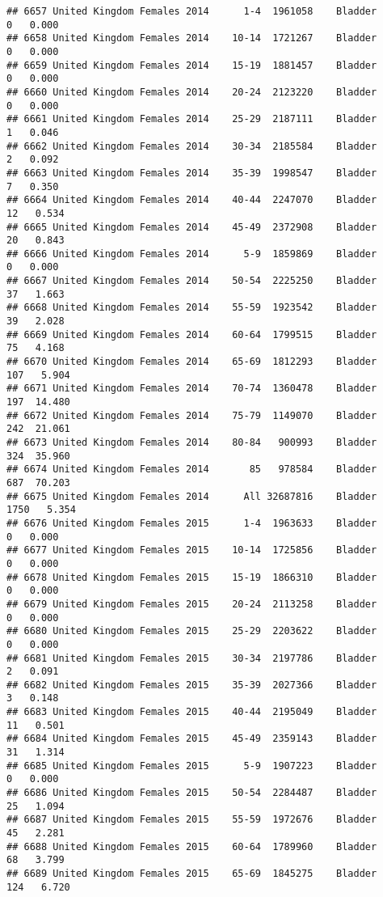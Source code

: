 \documentclass[
]{article}
\begin{document}
\begin{verbatim}
## 6657 United Kingdom Females 2014      1-4  1961058    Bladder      0   0.000
## 6658 United Kingdom Females 2014    10-14  1721267    Bladder      0   0.000
## 6659 United Kingdom Females 2014    15-19  1881457    Bladder      0   0.000
## 6660 United Kingdom Females 2014    20-24  2123220    Bladder      0   0.000
## 6661 United Kingdom Females 2014    25-29  2187111    Bladder      1   0.046
## 6662 United Kingdom Females 2014    30-34  2185584    Bladder      2   0.092
## 6663 United Kingdom Females 2014    35-39  1998547    Bladder      7   0.350
## 6664 United Kingdom Females 2014    40-44  2247070    Bladder     12   0.534
## 6665 United Kingdom Females 2014    45-49  2372908    Bladder     20   0.843
## 6666 United Kingdom Females 2014      5-9  1859869    Bladder      0   0.000
## 6667 United Kingdom Females 2014    50-54  2225250    Bladder     37   1.663
## 6668 United Kingdom Females 2014    55-59  1923542    Bladder     39   2.028
## 6669 United Kingdom Females 2014    60-64  1799515    Bladder     75   4.168
## 6670 United Kingdom Females 2014    65-69  1812293    Bladder    107   5.904
## 6671 United Kingdom Females 2014    70-74  1360478    Bladder    197  14.480
## 6672 United Kingdom Females 2014    75-79  1149070    Bladder    242  21.061
## 6673 United Kingdom Females 2014    80-84   900993    Bladder    324  35.960
## 6674 United Kingdom Females 2014       85   978584    Bladder    687  70.203
## 6675 United Kingdom Females 2014      All 32687816    Bladder   1750   5.354
## 6676 United Kingdom Females 2015      1-4  1963633    Bladder      0   0.000
## 6677 United Kingdom Females 2015    10-14  1725856    Bladder      0   0.000
## 6678 United Kingdom Females 2015    15-19  1866310    Bladder      0   0.000
## 6679 United Kingdom Females 2015    20-24  2113258    Bladder      0   0.000
## 6680 United Kingdom Females 2015    25-29  2203622    Bladder      0   0.000
## 6681 United Kingdom Females 2015    30-34  2197786    Bladder      2   0.091
## 6682 United Kingdom Females 2015    35-39  2027366    Bladder      3   0.148
## 6683 United Kingdom Females 2015    40-44  2195049    Bladder     11   0.501
## 6684 United Kingdom Females 2015    45-49  2359143    Bladder     31   1.314
## 6685 United Kingdom Females 2015      5-9  1907223    Bladder      0   0.000
## 6686 United Kingdom Females 2015    50-54  2284487    Bladder     25   1.094
## 6687 United Kingdom Females 2015    55-59  1972676    Bladder     45   2.281
## 6688 United Kingdom Females 2015    60-64  1789960    Bladder     68   3.799
## 6689 United Kingdom Females 2015    65-69  1845275    Bladder    124   6.720

\end{verbatim}
\end{document}
